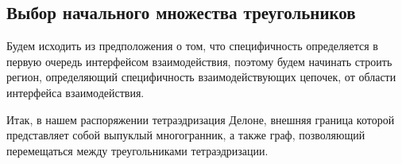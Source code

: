 






\subsection{Выбор начального множества треугольников}

Будем исходить из предположения о том, что специфичность определяется в первую очередь интерфейсом взаимодействия, поэтому будем начинать строить регион, определяющий специфичность взаимодействующих цепочек, от области интерфейса взаимодействия.

Итак, в нашем распоряжении тетраэдризация Делоне, внешняя граница которой представляет собой выпуклый многогранник, а также граф, позволяющий перемещаться между треугольниками тетраэдризации.

